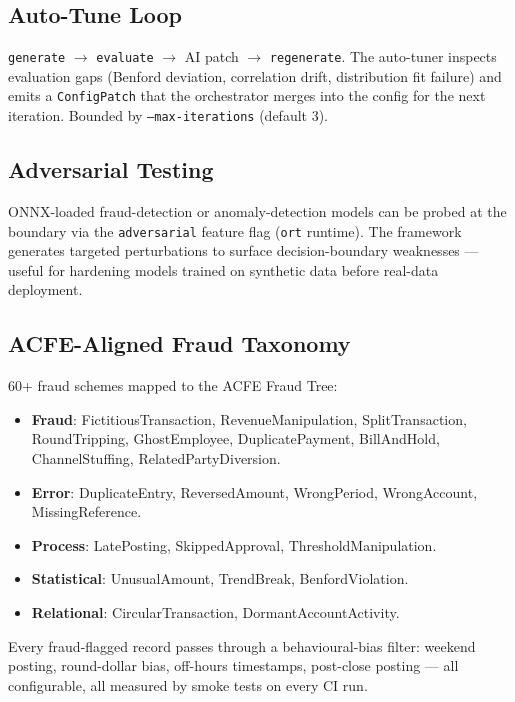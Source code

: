 \documentclass[11pt,a4paper]{article}
\begin{document}
\subsection{Auto-Tune Loop}

\texttt{generate} $\to$ \texttt{evaluate} $\to$ AI patch $\to$
\texttt{regenerate}. The auto-tuner inspects evaluation gaps (Benford
deviation, correlation drift, distribution fit failure) and emits a
\texttt{ConfigPatch} that the orchestrator merges into the config for the
next iteration. Bounded by \texttt{--max-iterations} (default 3).

\subsection{Adversarial Testing}

ONNX-loaded fraud-detection or anomaly-detection models can be probed at the
boundary via the \texttt{adversarial} feature flag (\texttt{ort} runtime).
The framework generates targeted perturbations to surface decision-boundary
weaknesses --- useful for hardening models trained on synthetic data before
real-data deployment.

\subsection{ACFE-Aligned Fraud Taxonomy}

60+ fraud schemes mapped to the ACFE Fraud Tree:

\begin{itemize}[leftmargin=1.2em, itemsep=3pt]
  \item \textbf{Fraud}: FictitiousTransaction, RevenueManipulation,
        SplitTransaction, RoundTripping, GhostEmployee, DuplicatePayment,
        BillAndHold, ChannelStuffing, RelatedPartyDiversion.
  \item \textbf{Error}: DuplicateEntry, ReversedAmount, WrongPeriod,
        WrongAccount, MissingReference.
  \item \textbf{Process}: LatePosting, SkippedApproval,
        ThresholdManipulation.
  \item \textbf{Statistical}: UnusualAmount, TrendBreak, BenfordViolation.
  \item \textbf{Relational}: CircularTransaction, DormantAccountActivity.
\end{itemize}

Every fraud-flagged record passes through a behavioural-bias filter:
weekend posting, round-dollar bias, off-hours timestamps, post-close
posting --- all configurable, all measured by smoke tests on every CI run.
\end{document}
